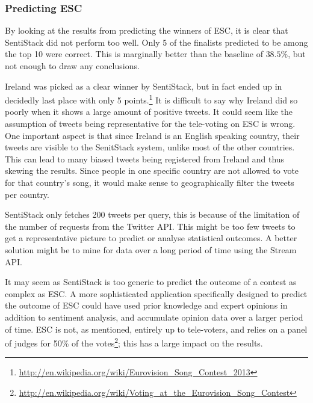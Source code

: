 \subsubsection{Predicting ESC}

By looking at the results from predicting the winners of ESC, it is clear that SentiStack did not perform too well. Only 5 of the finalists predicted to be among the top 10 were correct. This is marginally better than the baseline of $38.5\%$, but not enough to draw any conclusions. 

Ireland was picked as a clear winner by SentiStack, but in fact ended up in decidedly last place with only 5 points.\footnote{\url{http://en.wikipedia.org/wiki/Eurovision_Song_Contest_2013}} It is difficult to say why Ireland did so poorly when it shows a large amount of positive tweets. It could seem like the assumption of tweets being representative for the tele-voting on ESC is wrong. One important aspect is that since Ireland is an English speaking country, their tweets are visible to the SenitStack system, unlike most of the other countries. This can lead to many biased tweets being registered from Ireland and thus skewing the results. Since people in one specific country are not allowed to vote for that country's song, it would make sense to geographically filter the tweets per country.

SentiStack only fetches 200 tweets per query, this is because of the limitation of the number of requests from the Twitter API. This might be too few tweets to get a representative picture to predict or analyse statistical outcomes. A better solution might be to mine for data over a long period of time using the Stream API. 

It may seem as SentiStack is too generic to predict the outcome of a contest as complex as ESC. A more sophisticated application specifically designed to predict the outcome of ESC could have used prior knowledge and expert opinions in addition to sentiment analysis, and accumulate opinion data over a larger period of time. ESC is not, as mentioned, entirely up to tele-voters, and relies on a panel of judges for 50\% of the votes\footnote{\url{http://en.wikipedia.org/wiki/Voting_at_the_Eurovision_Song_Contest}}; this has a large impact on the results.

